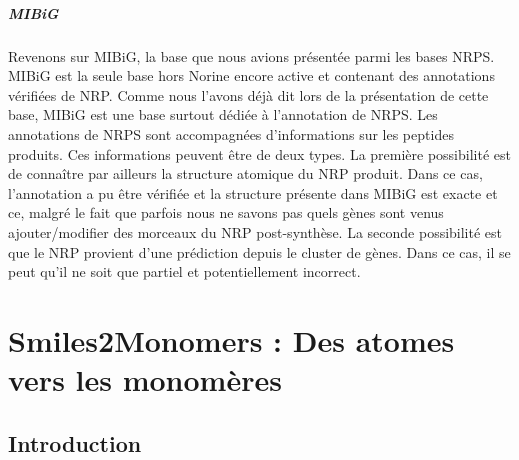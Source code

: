 \documentclass[12pt,french,twoside]{report}
\begin{document}
\paragraph{MIBiG}Revenons sur MIBiG, la base que nous avions présentée parmi les bases NRPS.
MIBiG est la seule base hors Norine encore active et contenant des annotations vérifiées de NRP.
Comme nous l'avons déjà dit lors de la présentation de cette base, MIBiG est une base surtout dédiée à l'annotation de NRPS.
Les annotations de NRPS sont accompagnées d'informations sur les peptides produits.
Ces informations peuvent être de deux types.
La première possibilité est de connaître par ailleurs la structure atomique du NRP produit.
Dans ce cas, l'annotation a pu être vérifiée et la structure présente dans MIBiG est exacte et ce, malgré le fait que parfois nous ne savons pas quels gènes sont venus ajouter/modifier des morceaux du NRP post-synthèse.
La seconde possibilité est que le NRP provient d'une prédiction depuis le cluster de gènes.
Dans ce cas, il se peut qu'il ne soit que partiel et potentiellement incorrect.
























\chapter{Smiles2Monomers : Des atomes vers les monomères}

\section{Introduction}
\end{document}
